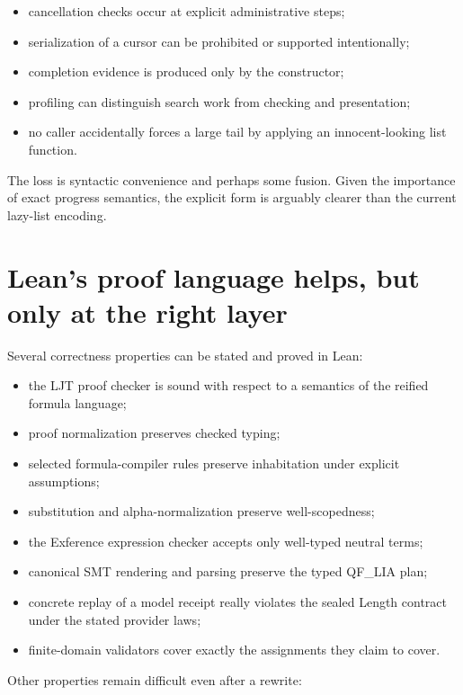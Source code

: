 \documentclass[10pt,letterpaper,oneside]{report}
\newcommand{\code}[1]{\texttt{\detokenize{#1}}}
\begin{document}
\begin{itemize}
  \item cancellation checks occur at explicit administrative steps;
  \item serialization of a cursor can be prohibited or supported intentionally;
  \item completion evidence is produced only by the \code{done} constructor;
  \item profiling can distinguish search work from checking and presentation;
  \item no caller accidentally forces a large tail by applying an innocent-looking list function.
\end{itemize}

The loss is syntactic convenience and perhaps some fusion. Given the importance of exact progress semantics, the explicit form is arguably clearer than the current lazy-list encoding.

\section{Lean's proof language helps, but only at the right layer}

Several correctness properties can be stated and proved in Lean:

\begin{itemize}
  \item the LJT proof checker is sound with respect to a semantics of the reified formula language;
  \item proof normalization preserves checked typing;
  \item selected formula-compiler rules preserve inhabitation under explicit assumptions;
  \item substitution and alpha-normalization preserve well-scopedness;
  \item the Exference expression checker accepts only well-typed neutral terms;
  \item canonical SMT rendering and parsing preserve the typed QF\_LIA plan;
  \item concrete replay of a model receipt really violates the sealed Length contract under the stated provider laws;
  \item finite-domain validators cover exactly the assignments they claim to cover.
\end{itemize}

Other properties remain difficult even after a rewrite:
\end{document}
